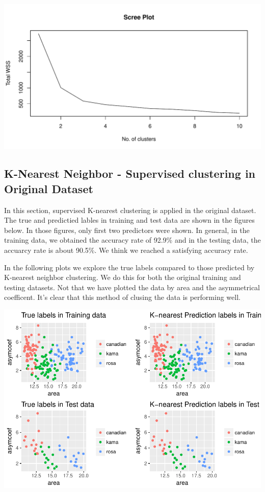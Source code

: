 \documentclass[]{article}
\begin{document}
\includegraphics{Project2_files/figure-latex/unnamed-chunk-5-1.pdf}

\subsection{K-Nearest Neighbor - Supervised clustering in Original
Dataset}\label{k-nearest-neighbor---supervised-clustering-in-original-dataset}

In this section, supervised K-nearest clustering is applied in the
original dataset. The true and predictied lables in training and test
data are shown in the figures below. In those figures, only first two
predictors were shown. In general, in the training data, we obtained the
accuracy rate of 92.9\% and in the testing data, the accuarcy rate is
about 90.5\%. We think we reached a satisfying accuracy rate.

In the following plots we explore the true labels compared to those
predicted by K-nearest neighbor clustering. We do this for both the
original training and testing datasets. Not that we have plotted the
data by area and the asymmetrical coefficent. It's clear that this
method of clusing the data is performing well.

\includegraphics{Project2_files/figure-latex/- Fei-1.pdf}
\end{document}
